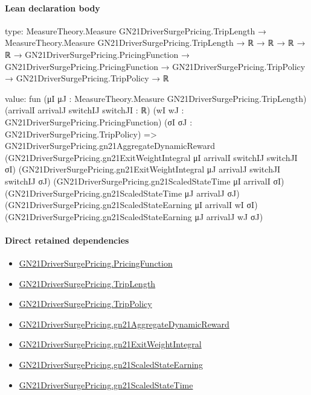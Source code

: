 \documentclass[10pt]{article}
\begin{document}
\paragraph{Lean declaration body}
\begin{ReviewVerbatim}
type:
MeasureTheory.Measure GN21DriverSurgePricing.TripLength →
  MeasureTheory.Measure GN21DriverSurgePricing.TripLength →
    ℝ →
      ℝ →
        ℝ →
          ℝ →
            GN21DriverSurgePricing.PricingFunction →
              GN21DriverSurgePricing.PricingFunction →
                GN21DriverSurgePricing.TripPolicy → GN21DriverSurgePricing.TripPolicy → ℝ

value:
fun (μI μJ : MeasureTheory.Measure GN21DriverSurgePricing.TripLength) (arrivalI arrivalJ switchIJ switchJI : ℝ)
    (wI wJ : GN21DriverSurgePricing.PricingFunction) (σI σJ : GN21DriverSurgePricing.TripPolicy) =>
  GN21DriverSurgePricing.gn21AggregateDynamicReward
    (GN21DriverSurgePricing.gn21ExitWeightIntegral μI arrivalI switchIJ switchJI σI)
    (GN21DriverSurgePricing.gn21ExitWeightIntegral μJ arrivalJ switchJI switchIJ σJ)
    (GN21DriverSurgePricing.gn21ScaledStateTime μI arrivalI σI)
    (GN21DriverSurgePricing.gn21ScaledStateTime μJ arrivalJ σJ)
    (GN21DriverSurgePricing.gn21ScaledStateEarning μI arrivalI wI σI)
    (GN21DriverSurgePricing.gn21ScaledStateEarning μJ arrivalJ wJ σJ)
\end{ReviewVerbatim}

\paragraph{Direct retained dependencies}
\begin{itemize}\raggedright
\item \hyperlink{governing-declaration-9ab0ab344da5df05}{GN21\allowbreak{}Driver\allowbreak{}Surge\allowbreak{}Pricing.\allowbreak{}Pricing\allowbreak{}Function}
\item \hyperlink{governing-declaration-a616c143f22cf2bc}{GN21\allowbreak{}Driver\allowbreak{}Surge\allowbreak{}Pricing.\allowbreak{}Trip\allowbreak{}Length}
\item \hyperlink{governing-declaration-4312ad4cb899871f}{GN21\allowbreak{}Driver\allowbreak{}Surge\allowbreak{}Pricing.\allowbreak{}Trip\allowbreak{}Policy}
\item \hyperlink{governing-declaration-014b12f4f75ccdb4}{GN21\allowbreak{}Driver\allowbreak{}Surge\allowbreak{}Pricing.\allowbreak{}gn21\allowbreak{}Aggregate\allowbreak{}Dynamic\allowbreak{}Reward}
\item \hyperlink{governing-declaration-14f0a8679c69b067}{GN21\allowbreak{}Driver\allowbreak{}Surge\allowbreak{}Pricing.\allowbreak{}gn21\allowbreak{}Exit\allowbreak{}Weight\allowbreak{}Integral}
\item \hyperlink{governing-declaration-4debedc07adf0d8c}{GN21\allowbreak{}Driver\allowbreak{}Surge\allowbreak{}Pricing.\allowbreak{}gn21\allowbreak{}Scaled\allowbreak{}State\allowbreak{}Earning}
\item \hyperlink{governing-declaration-93064a6aaad8ebb0}{GN21\allowbreak{}Driver\allowbreak{}Surge\allowbreak{}Pricing.\allowbreak{}gn21\allowbreak{}Scaled\allowbreak{}State\allowbreak{}Time}
\end{itemize}
\hypertarget{governing-declaration-b6de248b59bff61c}{}
\end{document}
